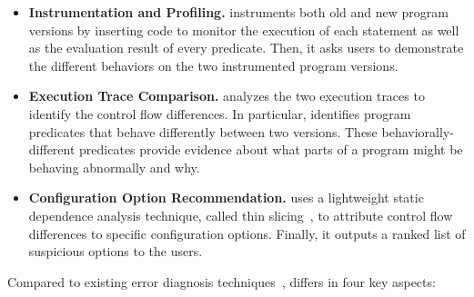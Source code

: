 \vspace{-2mm}

\begin{itemize}

\item \textbf{Instrumentation and Profiling.} \ourtool
instruments both old and new program versions by inserting
code to monitor the execution of each statement as well as the
evaluation result of every predicate. Then, it asks users to
demonstrate the different behaviors on the two instrumented
program versions. 

\item \textbf{Execution Trace Comparison.}
\ourtool analyzes the two execution traces to identify
the control flow differences. In particular, \ourtool
identifies program predicates that behave
differently between two versions. These
behaviorally-different predicates
provide evidence about what parts of a program might
be behaving abnormally
and why.

\item \textbf{Configuration Option Recommendation.} 
\ourtool uses a lightweight static dependence analysis
technique, called thin slicing~\cite{Sridharan:2007}, to attribute
control flow differences to specific configuration options.
Finally, it outputs a ranked list of suspicious options to the users.


\end{itemize}

Compared to existing error diagnosis
techniques~\cite{Wang:2004:AMT, Rabkin:2011:PPC, Whitaker:2004:CDS,
Zhang:2013:ADS, Attariyan:2010:ACT, Su:2007:AIC, Attariyan:2008:UCD, xray
}, \ourtool differs in four
key aspects:


